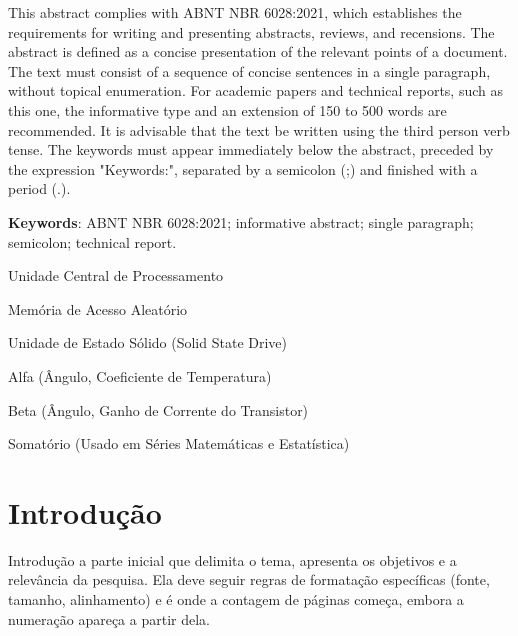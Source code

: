 \documentclass{Arquivos/TrabalhoAcademico}
\begin{document}
\begin{resumoEN}
This abstract complies with ABNT NBR 6028:2021, which establishes the requirements for writing and presenting abstracts, reviews, and recensions. The abstract is defined as a concise presentation of the relevant points of a document. The text must consist of a sequence of concise sentences in a single paragraph, without topical enumeration. For academic papers and technical reports, such as this one, the informative type and an extension of 150 to 500 words are recommended. It is advisable that the text be written using the third person verb tense. The keywords must appear immediately below the abstract, preceded by the expression "Keywords:", separated by a semicolon (;) and finished with a period (.).

\textbf{Keywords}: ABNT NBR 6028:2021; informative abstract; single paragraph; semicolon; technical report.
\end{resumoEN}


\listaDeFiguras
\listaDeTabelas


\begin{siglas}
    \item[CPU] Unidade Central de Processamento
    \item[RAM] Memória de Acesso Aleatório
    \item[SSD] Unidade de Estado Sólido (Solid State Drive)
\end{siglas}


\begin{simbolos}
    \item[$\alpha$] Alfa (Ângulo, Coeficiente de Temperatura)
    \item[$\beta$] Beta (Ângulo, Ganho de Corrente do Transistor)
    \item[$\sum$] Somatório (Usado em Séries Matemáticas e Estatística)
\end{simbolos}

\Sumario


\textual %


\chapter{Introdução}
Introdução a parte inicial que delimita o tema, apresenta os objetivos e a relevância da pesquisa. Ela deve seguir regras de formatação específicas (fonte, tamanho, alinhamento) e é onde a contagem de páginas começa, embora a numeração apareça a partir dela. 
\end{document}
